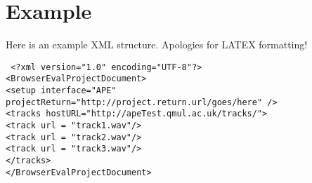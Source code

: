 \documentclass{article}
\begin{document}
\section{Example}

Here is an example XML structure. Apologies for LATEX formatting!

\texttt{
<?xml version="1.0" encoding="UTF-8"?> \\
<BrowserEvalProjectDocument> \\
<setup interface="APE" projectReturn="http://project.return.url/goes/here" />\\
    <tracks hostURL="http://apeTest.qmul.ac.uk/tracks/"> \\
        <track url = "track1.wav"/> \\
        <track url = "track2.wav"/> \\
        <track url = "track3.wav"/> \\
    </tracks> \\
</BrowserEvalProjectDocument>
}
\end{document}

